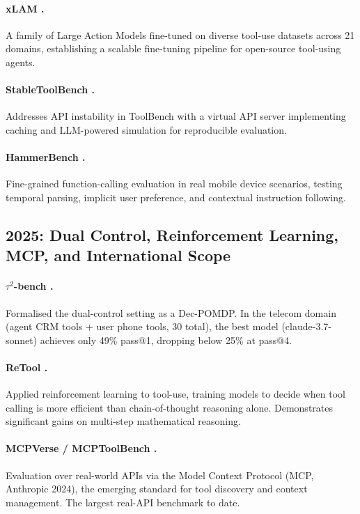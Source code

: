 \documentclass[11pt]{article}
\newcommand{\tautwobench}{$\tau^2$-bench}
\begin{document}
\paragraph{xLAM \citep{liu2024xlam}.}
A family of Large Action Models fine-tuned on diverse tool-use datasets across 21 domains,
establishing a scalable fine-tuning pipeline for open-source tool-using agents.

\paragraph{StableToolBench \citep{guo2024stabletoolbench}.}
Addresses API instability in ToolBench with a virtual API server implementing caching and
LLM-powered simulation for reproducible evaluation.

\paragraph{HammerBench \citep{wang2024hammerbench}.}
Fine-grained function-calling evaluation in real mobile device scenarios, testing temporal
parsing, implicit user preference, and contextual instruction following.

\subsection{2025: Dual Control, Reinforcement Learning, MCP, and International Scope}

\paragraph{\tautwobench{} \citep{barres2025tau2}.}
Formalised the dual-control setting as a Dec-POMDP. In the telecom domain (agent CRM tools + user
phone tools, 30 total), the best model (claude-3.7-sonnet) achieves only 49\% pass@1, dropping
below 25\% at pass@4.

\paragraph{ReTool \citep{feng2025retool}.}
Applied reinforcement learning to tool-use, training models to decide when tool calling is more
efficient than chain-of-thought reasoning alone. Demonstrates significant gains on multi-step
mathematical reasoning.

\paragraph{MCPVerse / MCPToolBench \citep{mcpverse2025}.}
Evaluation over real-world APIs via the Model Context Protocol (MCP, Anthropic 2024), the emerging
standard for tool discovery and context management. The largest real-API benchmark to date.
\end{document}
